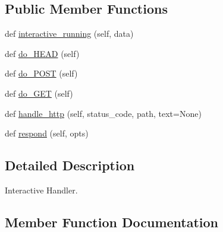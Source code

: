 \subsection*{Public Member Functions}
\begin{DoxyCompactItemize}
\item 
def \hyperlink{classprojects_1_1image__chat_1_1interactive_1_1MyHandler_a6db12cd5204d5f4469f8570c7c38d007}{interactive\+\_\+running} (self, data)
\item 
def \hyperlink{classprojects_1_1image__chat_1_1interactive_1_1MyHandler_a40845d6fbb9eed68138c9ae1c52d1344}{do\+\_\+\+H\+E\+AD} (self)
\item 
def \hyperlink{classprojects_1_1image__chat_1_1interactive_1_1MyHandler_a7dcb1ea02322e970240bd16b605096fd}{do\+\_\+\+P\+O\+ST} (self)
\item 
def \hyperlink{classprojects_1_1image__chat_1_1interactive_1_1MyHandler_adfa43f376385fc93432e34306cc93308}{do\+\_\+\+G\+ET} (self)
\item 
def \hyperlink{classprojects_1_1image__chat_1_1interactive_1_1MyHandler_af277e2d0f6c00fc1d0d3467c577a20f8}{handle\+\_\+http} (self, status\+\_\+code, path, text=None)
\item 
def \hyperlink{classprojects_1_1image__chat_1_1interactive_1_1MyHandler_a8c651ac02abcedfd49fd7b89128ee737}{respond} (self, opts)
\end{DoxyCompactItemize}


\subsection{Detailed Description}
\begin{DoxyVerb}Interactive Handler.
\end{DoxyVerb}
 

\subsection{Member Function Documentation}
\mbox{\label{classprojects_1_1image__chat_1_1interactive_1_1MyHandler_adfa43f376385fc93432e34306cc93308}} 
